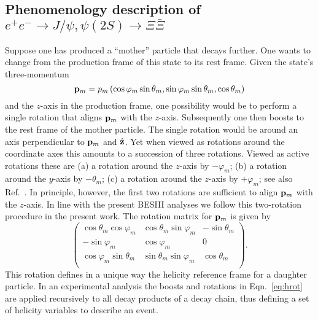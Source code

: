 \subsection{Phenomenology description of \texorpdfstring{$e^+e^-\to J/\psi,\psi(2S)\to \Xi\bar\Xi$}{eeXiXi}}\label{sub:C}

 Suppose one has produced a ``mother'' particle that
decays further. One wants to change from the production frame of this state to its rest frame. 
Given the state's three-momentum 
\begin{equation}
  {\bf p}_m = 
p_m \, (\cos\varphi_m\sin\theta_m,\sin\varphi_m\sin\theta_m,\cos\theta_m)
\end{equation}
and the $z$-axis in the production frame, one possibility would be to 
perform a single rotation that aligns ${\bf p}_m$ with the $z$-axis. 
Subsequently one then boosts to the rest frame of the mother particle. 
The single rotation would be around an axis perpendicular to 
${\bf p}_m$ and $\hat {\bf z}$. Yet when viewed as rotations around 
the coordinate axes this amounts to a succession of three rotations. 
Viewed as active rotations these are 
(a) a rotation around the $z$-axis by $-\varphi_m$; (b) a rotation around 
the $y$-axis by $-\theta_m$; (c) a rotation around the $z$-axis by $+\varphi_m$; see also Ref.~\cite{Jacob:1959at}. 
In principle, however, the first two rotations are sufficient to align
${\bf p}_m$ with the $z$-axis. In line with the present BESIII analyses 
we follow this two-rotation procedure
in the present work. The rotation matrix for ${\bf p}_m$ is given by
\begin{equation}
\left(
\begin{array}{rrr}
 \cos\theta_m \cos\varphi_m & \cos\theta_m \sin\varphi_m & -\sin\theta_m \\
 -\sin\varphi_m & \cos\varphi_m & 0 \\
 \cos\varphi_m \sin\theta_m & \sin\theta_m \sin\varphi_m & \cos\theta_m \\
\end{array}
\right).\label{eq:hrot}
\end{equation}
This rotation defines in a unique way the helicity reference frame 
for a daughter particle.
In an experimental analysis the  boosts and rotations in Eqn.~\eqref{eq:hrot}
are applied recursively to all decay products of
a decay chain, thus
defining a set of  helicity variables
to describe an event. 


